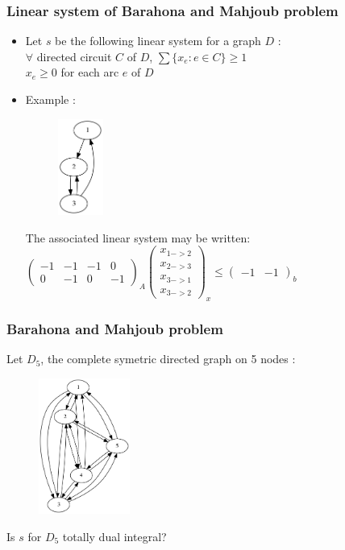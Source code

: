 \documentclass{beamer}
\begin{document}

\begin{frame}
	\frametitle{Linear system of Barahona and Mahjoub problem}
	\begin{itemize}
		\item
		Let $s$ be the following linear system for a graph $D$ :\\
		$\forall$ directed circuit $C$ of $D$, $\sum\{x_e:e\in C\}\geqslant 1$\\
		$x_e\geqslant 0$ for each arc $e$ of $D$ 
		\item
		Example : 
		\begin{figure}
			\centering
			\includegraphics[width=1.5cm]{images/example1.png}
		\end{figure}
		The associated linear system may be written:\\
		$\begin{pmatrix} -1 & -1 & -1 & 0\\ 0 & -1 & 0 & -1 \end{pmatrix}_A \begin{pmatrix} x_{1->2}\\ x_{2->3}\\ x_{3->1}\\ x_{3->2} \end{pmatrix}_x \leqslant \begin{pmatrix} -1 & -1 \end{pmatrix}_b$\\
	\end{itemize}
\end{frame}
	
\begin{frame}
	\frametitle{Barahona and Mahjoub problem}
	Let $D_5$, the complete symetric directed graph on 5 nodes :
	\begin{figure}
		\centering
		\includegraphics[width=3cm]{images/D5.png}
	\end{figure}
	Is $s$ for $D_5$ totally dual integral?
\end{frame}
\end{document}
